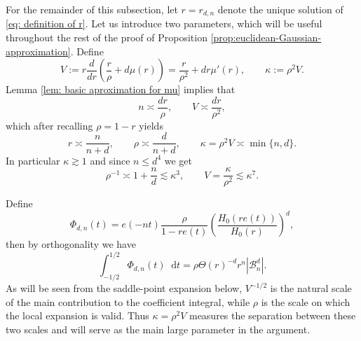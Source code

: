 \documentclass{article}
\newcommand{\dd}{\mathop{}\!\mathrm{d}}
\theoremstyle{plain}
\numberwithin{equation}{section}
\begin{document}
For the remainder of this subsection, let $r=r_{d,n}$ denote the unique solution of \eqref{eq: definition of r}. Let us introduce two parameters, which will be useful throughout the rest of the proof of Proposition \ref{prop:euclidean-Gaussian-approximation}. Define
 \begin{equation}
 \label{eq: def V kappa}
     V:=r \frac{d}{dr} \left(\frac{r}{\rho} + d \mu(r)\right)=\frac{r}{\rho^2}+ d r \mu'(r), \qquad  \kappa:=\rho^2V.
 \end{equation}
Lemma \ref{lem: basic aproximation for mu} implies that
 \[
n \asymp \frac{dr}{\rho}, \qquad V \asymp \frac{dr}{\rho^2},
 \]
 which after recalling $\rho=1-r$ yields
 \begin{equation} \label{eq: kappa, r , rho properties}
     r \asymp \frac{n}{n+d}, \qquad \rho \asymp \frac{d}{n+d}, \qquad \kappa=\rho^2 V \asymp \min\{n,d \}.
 \end{equation}
 In particular $\kappa \gtrsim 1$ and since $n \le d^4$ we get 
 \begin{equation} \label{eq: bound on V in terms of power of kappa}
     \rho^{-1} \asymp 1+\frac{n}{d} \lesssim \kappa^3, \qquad V= \frac{\kappa}{\rho^2} \lesssim \kappa^{7}.
 \end{equation}

Define
\begin{equation}\label{eq:euclidean-Phi}
 \Phi_{d,n}(t)
 =e(-nt)\frac{\rho}{1-re(t)}
 \left(\frac{H_0(re(t))}{H_0(r)}\right)^d,
\end{equation}
then by orthogonality we have
\[
\int_{-1/2}^{1/2} \Phi_{d,n}(t) \dd t=\rho \Theta(r)^{-d} r^n |\mathcal{B}_n^d|.
\]
As will be seen from the saddle-point expansion below, $V^{-1/2}$ is the natural scale of the main contribution to the coefficient integral, while $\rho$ is the scale on which the local expansion is valid. Thus $\kappa=\rho^2V$ measures the separation between these two scales and will serve as the main large parameter in the argument.
\end{document}
